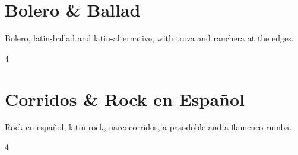 \documentclass[a4paper,landscape]{memoir}
\begin{document}
\chapter{Bolero \& Ballad}
Bolero, latin-ballad and latin-alternative, with trova and ranchera at the edges.
\clearpage\begin{multicols*}{4}
\end{multicols*}

\chapter{Corridos \& Rock en Español}
Rock en español, latin-rock, narcocorridos, a pasodoble and a flamenco rumba.
\clearpage\begin{multicols*}{4}
\end{multicols*}
\end{document}
